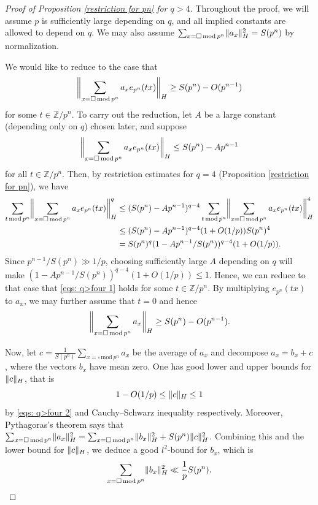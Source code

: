 \documentclass[11pt]{amsart}
\theoremstyle{plain} %
\theoremstyle{remark}
\numberwithin{equation}{section}
\newcommand{\Z}{\mathbb{Z}}
\DeclarePairedDelimiter\norm{\lVert}{\rVert}
\newcommand{\sqp}[1]{\sum_{#1=\square\,\mathrm{mod}\,p^n}}
\newcommand{\ap}[1]{\sum_{#1\,\mathrm{mod}\,p^n}}
\begin{document}
\begin{proof}[Proof of Proposition \ref{restriction for pn} for $q>4$]
    Throughout the proof, we will assume $p$ is sufficiently large depending on $q$, and all implied constants are allowed to depend on $q$. We may also assume $\sqp{x}\norm{a_x}_H^2=S(p^n)$ by normalization.

    We would like to reduce to the case that 
    \begin{equation}\label{eqs: q>four 1}
        \norm[\bigg]{\sqp{x}a_xe_{p^n}(tx)}_H\geq S(p^n)-O(p^{n-1})
    \end{equation}
    for some $t\in \Z/p^n$. To carry out the reduction, let $A$ be a large constant (depending only on $q$) chosen later, and suppose 
    \begin{equation*}
        \norm[\bigg]{\sqp{x}a_xe_{p^n}(tx)}_H\leq S(p^n)-Ap^{n-1}
    \end{equation*}
    for all $t\in \Z/p^n$. Then, by restriction estimates for $q=4$ (Proposition \ref{restriction for pn}), we have 
    \begin{equation*}
        \begin{split}
            \ap{t} \norm[\bigg]{\sqp{x}a_xe_{p^n}(tx)}_H^q&\leq (S(p^n)-Ap^{n-1})^{q-4} \ap{t} \norm[\bigg]{\sqp{x}a_xe_{p^n}(tx)}_H^4\\
            &\leq (S(p^n)-Ap^{n-1})^{q-4} (1+O(1/p))S(p^n)^4\\
            &=S(p^n)^q (1-Ap^{n-1}/S(p^n))^{q-4}(1+O(1/p)).
        \end{split}
    \end{equation*}
    Since $p^{n-1}/S(p^n)\gg 1/p$, choosing sufficiently large $A$ depending on $q$ will make $(1-Ap^{n-1}/S(p^n))^{q-4}(1+O(1/p))\leq 1$. Hence, we can reduce to that case that \eqref{eqs: q>four 1} holds for some $t\in \Z/p^n$. By multiplying $e_{p^n}(tx)$ to $a_x$, we may further assume that $t=0$ and hence
    \begin{equation}\label{eqs: q>four 2}
        \norm[\bigg]{\sqp{x}a_x}_H\geq S(p^n)-O(p^{n-1}).
    \end{equation}

    Now, let $c=\frac{1}{S(p^n)}\sqp{x}a_x$ be the average of $a_x$ and decompose $a_x=b_x+c$, where the vectors $b_x$ have mean zero. One has good lower and upper bounds for $\norm{c}_H$, that is
    \begin{equation*}
        1-O(1/p)\leq \norm{c}_H\leq 1
    \end{equation*}
    by \eqref{eqs: q>four 2} and Cauchy--Schwarz inequality respectively. Moreover, Pythagoras's theorem says that $\sqp{x}\norm{a_x}^2_H=\sqp{x}\norm{b_x}^2_H+S(p^n)\norm{c}^2_H$. Combining this and the lower bound for $\norm{c}_H$, we deduce a good $l^2$-bound for $b_x$, which is
    \begin{equation}\label{eqs: q>four 3}
        \sqp{x}\norm{b_x}^2_H\ll \frac{1}{p}S(p^n).
    \end{equation}


\end{proof}
\end{document}
